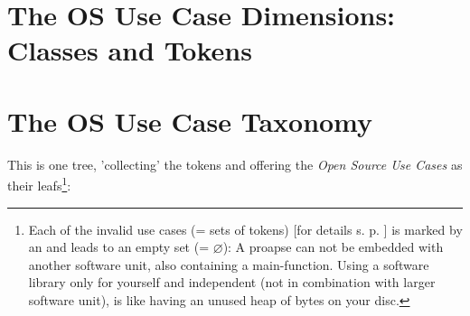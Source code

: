 \section{The OS Use Case Dimensions: Classes and Tokens}


\begin{footnotesize}


\end{footnotesize}  
  

\section{The OS Use Case Taxonomy}

This is one tree, 'collecting' the tokens and offering the \emph{Open Source Use
Cases} as their leafs\footnote{ Each of the invalid use cases (= sets of tokens)
[for details s. p. \pageref{InvalidFinderTokenCombinations}] is marked by an
\lightning{} and leads to an empty set (= $\varnothing$): A proapse can not be
embedded with another software unit, also containing a main-function. Using
a software library only for yourself and independent (not in combination with larger
software unit), is like having an unused heap of bytes on your disc.}:

